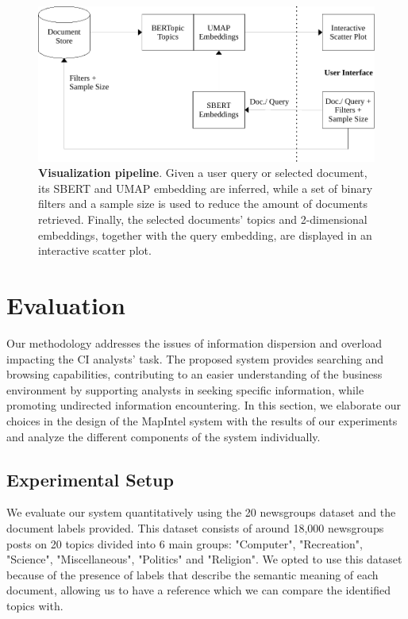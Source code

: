 \documentclass[a4paper]{article}
\begin{document}
\begin{figure}[H]
  \centering
  \includegraphics[scale=0.7]{./assets/vis_pipeline}
  \caption{\textbf{Visualization pipeline}. Given a user query or selected document, its SBERT and UMAP embedding are inferred, while a set of binary filters and a sample size is used to reduce the amount of documents retrieved. Finally, the selected documents' topics and 2-dimensional embeddings, together with the query embedding, are displayed in an interactive scatter plot.}
  \label{vis_pipeline}
\end{figure}

\section{Evaluation}
Our methodology addresses the issues of information dispersion and overload impacting the CI analysts' task. The proposed system provides searching and browsing capabilities, contributing to an easier understanding of the business environment by supporting analysts in seeking specific information, while promoting undirected information encountering. In this section, we elaborate our choices in the design of the MapIntel system with the results of our experiments and analyze the different components of the system individually.

\subsection{Experimental Setup}
We evaluate our system quantitatively using the 20 newsgroups \citep{pedregosa2011} dataset and the document labels provided. This dataset consists of around 18,000 newsgroups posts on 20 topics divided into 6 main groups: "Computer", "Recreation", "Science", "Miscellaneous", "Politics" and "Religion". We opted to use this dataset because of the presence of labels that describe the semantic meaning of each document, allowing us to have a reference which we can compare the identified topics with.
\end{document}

